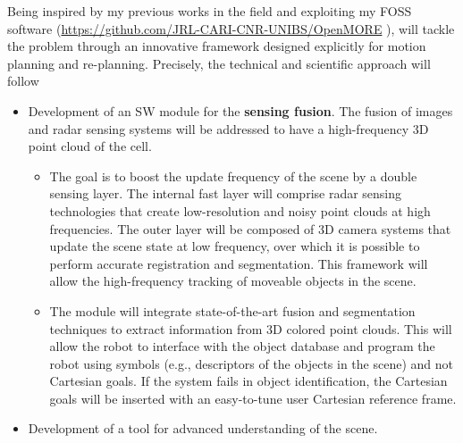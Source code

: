 Being inspired by my previous works in the field and exploiting my FOSS
software (\url{https://github.com/JRL-CARI-CNR-UNIBS/OpenMORE} ),
 will tackle the problem through an innovative
framework designed explicitly for motion planning and re-planning.
Precisely, the technical and scientific approach will follow

\begin{itemize}
\item
  Development of an SW module for the \textbf{sensing fusion}. The
  fusion of images and radar sensing systems will be addressed to have a
  high-frequency 3D point cloud of the cell.

  \begin{itemize}
  \item
    The goal is to boost the update frequency of the scene by a double
    sensing layer. The internal fast layer will comprise radar sensing
    technologies that create low-resolution and noisy point clouds at
    high frequencies. The outer layer will be composed of 3D camera
    systems that update the scene state at low frequency, over which it
    is possible to perform accurate registration and segmentation. This
    framework will allow the high-frequency tracking of moveable objects
    in the scene.
  \item
    The module will integrate state-of-the-art fusion and segmentation
    techniques to extract information from 3D colored point clouds. This
    will allow the robot to interface with the object database and
    program the robot using symbols (e.g., descriptors of the objects in
    the scene) and not Cartesian goals. If the system fails in object
    identification, the Cartesian goals will be inserted with an
    easy-to-tune user Cartesian reference frame.
  \end{itemize}
\item
  Development of a tool for advanced understanding of the scene.


\end{itemize}
